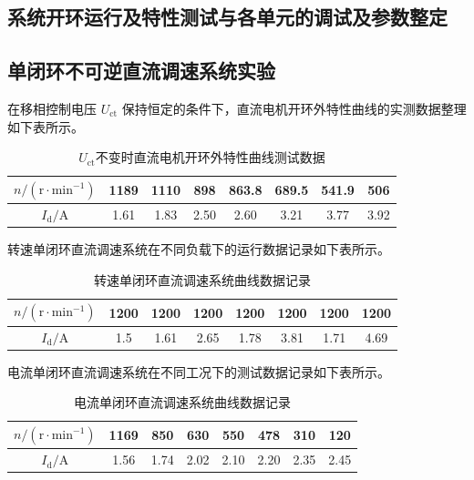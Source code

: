 \begin{framed}
{			\subsection{系统开环运行及特性测试与各单元的调试及参数整定}
			
			
			\subsection{单闭环不可逆直流调速系统实验}
			
			在移相控制电压 $U_{\text{ct}}$ 保持恒定的条件下，直流电机开环外特性曲线的实测数据整理如下表所示。
			\begin{table}[H]
				\centering
				\caption{\hspace{0.5em}$U_{\text{ct}}$不变时直流电机开环外特性曲线测试数据}
				\begin{tabular}{cccccccc}
					\toprule
					$n/(\text{r}\cdot\text{min}^{-1})$ & 1189 & 1110 & 898 & 863.8 & 689.5 & 541.9 & 506 \\
					\midrule
					$I_{\text{d}}/\text{A}$ & 1.61 & 1.83 & 2.50 & 2.60 & 3.21 & 3.77 & 3.92 \\
					\bottomrule
				\end{tabular}
			\end{table}
			
			转速单闭环直流调速系统在不同负载下的运行数据记录如下表所示。
			\begin{table}[H]
				\centering
				\caption{\hspace{0.5em}转速单闭环直流调速系统曲线数据记录}
				\begin{tabular}{cccccccc}
					\toprule
					$n/(\text{r}\cdot\text{min}^{-1})$ & 1200 & 1200 & 1200 & 1200 & 1200 & 1200 & 1200 \\
					\midrule
					$I_{\text{d}}/\text{A}$ & 1.5 & 1.61 & 2.65 & 1.78 & 3.81 & 1.71 & 4.69 \\
					\bottomrule
				\end{tabular}
			\end{table}
			
			电流单闭环直流调速系统在不同工况下的测试数据记录如下表所示。
			\begin{table}[H]
				\centering
				\caption{\hspace{0.5em}电流单闭环直流调速系统曲线数据记录}
				\begin{tabular}{cccccccc}
					\toprule
					$n/(\text{r}\cdot\text{min}^{-1})$ & 1169 & 850 & 630 & 550 & 478 & 310 & 120 \\
					\midrule
					$I_{\text{d}}/\text{A}$ & 1.56 & 1.74 & 2.02 & 2.10 & 2.20 & 2.35 &2.45 \\
					\bottomrule
				\end{tabular}
			\end{table}
			
}
\end{framed}
